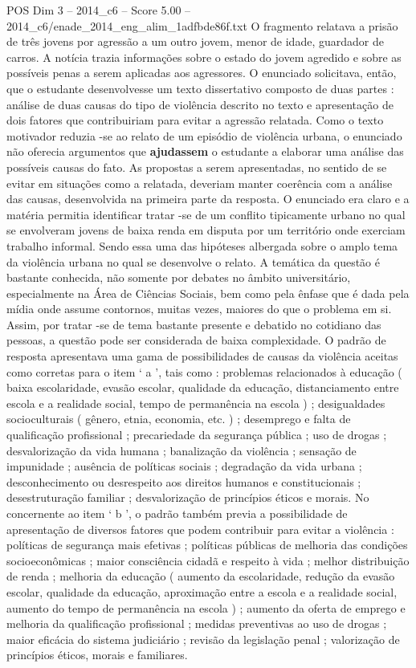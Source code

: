 \begin{textsample}{POS Dim 3 – 2014\_c6 – Score 5.00 – 2014\_c6/enade\_2014\_eng\_alim\_1adfbde86f.txt}
O fragmento relatava a prisão de três jovens por agressão a um outro jovem, menor de idade, guardador de carros.
A notícia trazia informações sobre o estado do jovem agredido e sobre as possíveis penas a serem aplicadas aos agressores.
O enunciado solicitava, então, que o estudante desenvolvesse um texto dissertativo composto de duas partes : análise de duas causas do tipo de violência descrito no texto e apresentação de dois fatores que contribuiriam para evitar a agressão relatada.
Como o texto motivador reduzia -se ao relato de um episódio de violência urbana, o enunciado não oferecia argumentos que \textbf{ajudassem} o estudante a elaborar uma análise das possíveis causas do fato.
As propostas a serem apresentadas, no sentido de se evitar em situações como a relatada, deveriam manter coerência com a análise das causas, desenvolvida na primeira parte da resposta.
O enunciado era claro e a matéria permitia identificar tratar -se de um conflito tipicamente urbano no qual se envolveram jovens de baixa renda em disputa por um território onde exerciam trabalho informal.
Sendo essa uma das hipóteses albergada sobre o amplo tema da violência urbana no qual se desenvolve o relato.
A temática da questão é bastante conhecida, não somente por debates no âmbito universitário, especialmente na Área de Ciências Sociais, bem como pela ênfase que é dada pela mídia onde assume contornos, muitas vezes, maiores do que o problema em si.
Assim, por tratar -se de tema bastante presente e debatido no cotidiano das pessoas, a questão pode ser considerada de baixa complexidade.
O padrão de resposta apresentava uma gama de possibilidades de causas da violência aceitas como corretas para o item ‘ a ’, tais como : problemas relacionados à educação ( baixa escolaridade, evasão escolar, qualidade da educação, distanciamento entre escola e a realidade social, tempo de permanência na escola ) ; desigualdades socioculturais ( gênero, etnia, economia, etc. ) ; desemprego e falta de qualificação profissional ; precariedade da segurança pública ; uso de drogas ; desvalorização da vida humana ; banalização da violência ; sensação de impunidade ; ausência de políticas sociais ; degradação da vida urbana ; desconhecimento ou desrespeito aos direitos humanos e constitucionais ; desestruturação familiar ; desvalorização de princípios éticos e morais.
No concernente ao item ‘ b ’, o padrão também previa a possibilidade de apresentação de diversos fatores que podem contribuir para evitar a violência : políticas de segurança mais efetivas ; políticas públicas de melhoria das condições socioeconômicas ; maior consciência cidadã e respeito à vida ; melhor distribuição de renda ; melhoria da educação ( aumento da escolaridade, redução da evasão escolar, qualidade da educação, aproximação entre a escola e a realidade social, aumento do tempo de permanência na escola ) ; aumento da oferta de emprego e melhoria da qualificação profissional ; medidas preventivas ao uso de drogas ; maior eficácia do sistema judiciário ; revisão da legislação penal ; valorização de princípios éticos, morais e familiares.

\end{textsample}
